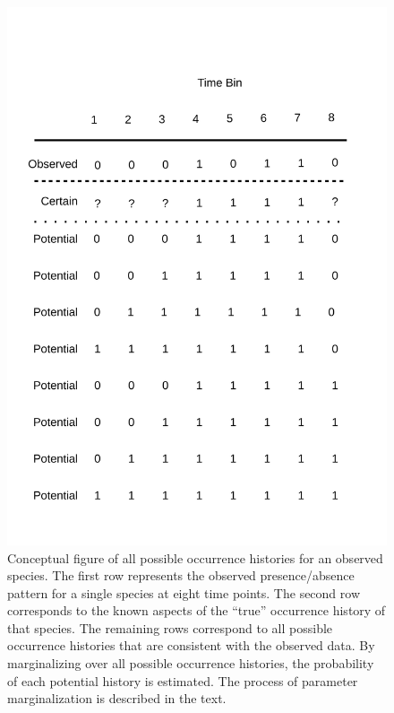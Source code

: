 \documentclass[12pt,letterpaper]{article}
\begin{document}
\begin{figure}[ht]
  \centering
  \includegraphics[height=0.4\textheight, width=\textwidth, keepaspectratio=true]{figure/margin}
  \caption[Conceptual figure of all possible occurrence histories for an observed species]{Conceptual figure of all possible occurrence histories for an observed species. The first row represents the observed presence/absence pattern for a single species at eight time points. The second row corresponds to the known aspects of the ``true'' occurrence history of that species. The remaining rows correspond to all possible occurrence histories that are consistent with the observed data. By marginalizing over all possible occurrence histories, the probability of each potential history is estimated. The process of parameter marginalization is described in the text.}
  \label{fig:margin_concept}
\end{figure}
\end{document}
